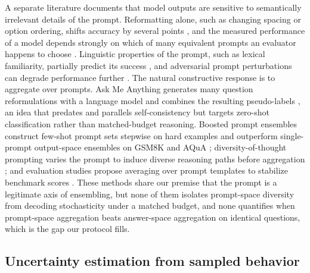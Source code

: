 A separate literature documents that model outputs are sensitive to semantically irrelevant details of the prompt. Reformatting alone, such as changing spacing or option ordering, shifts accuracy by several points \citep{sclar2024quantifying}, and the measured performance of a model depends strongly on which of many equivalent prompts an evaluator happens to choose \citep{mizrahi2024state}. Linguistic properties of the prompt, such as lexical familiarity, partially predict its success \citep{leidinger2023language}, and adversarial prompt perturbations can degrade performance further \citep{zhu2023promptbench}. The natural constructive response is to aggregate over prompts. Ask Me Anything generates many question reformulations with a language model and combines the resulting pseudo-labels \citep{arora2023ask}, an idea that predates and parallels self-consistency but targets zero-shot classification rather than matched-budget reasoning. Boosted prompt ensembles construct few-shot prompt sets stepwise on hard examples and outperform single-prompt output-space ensembles on GSM8K and AQuA \citep{pitis2023boosted}; diversity-of-thought prompting varies the prompt to induce diverse reasoning paths before aggregation \citep{naik2023diversity}; and evaluation studies propose averaging over prompt templates to stabilize benchmark scores \citep{mizrahi2024state}. These methods share our premise that the prompt is a legitimate axis of ensembling, but none of them isolates prompt-space diversity from decoding stochasticity under a matched budget, and none quantifies when prompt-space aggregation beats answer-space aggregation on identical questions, which is the gap our protocol fills.

\subsection{Uncertainty estimation from sampled behavior}

